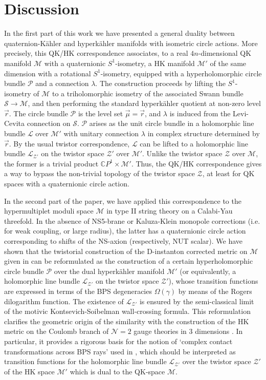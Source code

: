 \documentclass[12pt,reqno]{article}
\numberwithin{equation}{section}
\newcommand{\CP}{\IC P^1}
\newcommand{\cS}{\mathcal{S}}
\newcommand{\cM}{\mathcal{M}}
\newcommand{\cN}{\mathcal{N}}
\newcommand{\cP}{\mathcal{P}}
\newcommand{\cZ}{\mathcal{Z}}
\newcommand{\IC}{\mathbb{C}}
\newcommand{\lb}{\mathscr{L}}
\def\pcM{\cM'}
\def\pcZ{\cZ'}
\def\conhyper{\lambda}
\numberwithin{equation}{section}
\begin{document}
\section{Discussion}

In the first part of this work we have presented
a general duality between quaternion-K\"ahler and hyperk\"ahler manifolds with
isometric circle actions.
More precisely, this QK/HK correspondence associates, to a real $4n$-dimensional
QK manifold $\cM$ with a quaternionic $S^{1}$-isometry, a HK manifold $\pcM$ of
the same dimension with a rotational $S^1$-isometry, equipped with a hyperholomorphic circle bundle
$\cP$ and a connection $\lambda$. The construction proceeds by lifting the $S^1$-isometry
of $\cM$ to a triholomorphic isometry of the associated Swann bundle
$\cS\to \cM$, and then performing the standard hyperk\"ahler quotient at non-zero level $\vec r$.
The circle bundle $\cP$ is the level set $\vec\mu=\vec r$, and $\lambda$
is induced from the Levi-Cevita connection on $\cS$. $\cP$
arises as the unit circle bundle in a holomorphic line bundle $\lb$ over $\pcM$
with unitary connection $\conhyper$ in complex structure determined by $\vec r$. By
the usual twistor correspondence, $\lb$ can be lifted to a holomorphic line bundle $\lb_{\pcZ}$
on the twistor space $\pcZ$ over $\pcM$. Unlike the twistor space $\cZ$ over $\cM$,
the former is a trivial product $\CP\times \pcM$. Thus, the QK/HK correspondence
gives a way to bypass the non-trivial topology of the twistor space $\cZ$,
at least for QK spaces with a quaternionic circle action.

In the second part of the paper, we have applied this correspondence to the hypermultiplet moduli space
$\cM$ in type II string theory on a Calabi-Yau threefold. In the absence of NS5-brane or
Kaluza-Klein monopole corrections (i.e. for weak coupling, or large radius), the latter
has a quaternionic circle action corresponding to shifts of the NS-axion (respectively, NUT
scalar). We have shown that the twistorial construction of the D-instanton corrected metric on $\cM$
given in \cite{Alexandrov:2008gh} can be reformulated as the construction
of a certain hyperholomorphic circle bundle
$\cP$ over the dual hyperk\"ahler manifold $\pcM$ (or equivalently,
a holomorphic line bundle $\lb_{\pcZ}$ on the twistor space $\pcZ$),
whose transition functions are expressed
in terms of the BPS degeneracies $\Omega(\gamma)$ by means of the Rogers dilogarithm function. The existence
of $\lb_{\pcZ}$  is ensured by the semi-classical limit of the motivic Kontsevich-Soibelman wall-crossing formula.
This reformulation clarifies the geometric origin of the similarity with the construction
of the HK metric on the Coulomb branch of $\cN=2$ gauge theories in 3
dimensions \cite{Gaiotto:2008cd}. In particular, it
provides a rigorous basis for the notion of `complex contact transformations
across BPS rays' used in
\cite{Alexandrov:2008gh}, which should be interpreted as transition functions for
the holomorphic line bundle $\lb_{\pcZ}$ over the twistor space $\pcZ$ of the HK
space $\pcM$ which is dual to the QK-space $\cM$.
\end{document}
